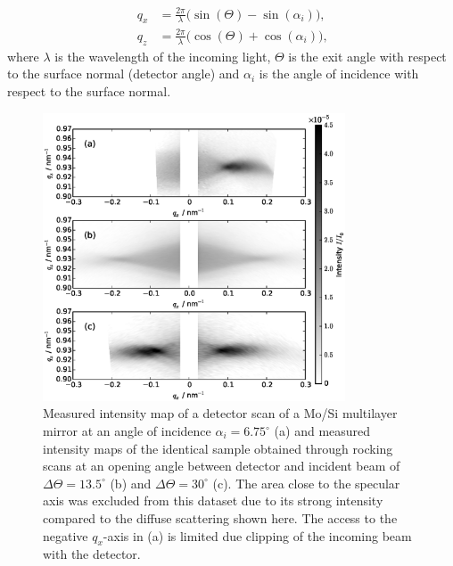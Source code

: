 \documentclass[twocolumn,osajnl,showpacs,superscriptaddress,11pt]{revtex4-1}
\begin{document}
\begin{align}
	q_x &= \frac{2 \pi}{\lambda} \big(\sin(\Theta) - \sin(\alpha_i)\big) \text{,}\\
	q_z &= \frac{2\pi}{\lambda} \big(\cos(\Theta) + \cos(\alpha_i)\big) \text{,} 
\end{align}
where $\lambda$ is the wavelength of the incoming light, $\Theta$ is the exit angle with respect to the surface normal (detector angle) and $\alpha_i$ is the angle of incidence with respect to the surface normal.

\begin{figure}
        \includegraphics[width=
        0.8\textwidth]{measured_maps} \caption{Measured intensity map of a detector scan of a Mo/Si multilayer mirror at an angle of incidence $\alpha_i = 6.75^\circ$ (a) and  measured intensity maps of the identical sample obtained through rocking scans at an opening angle between detector and incident beam of $\Delta \Theta = 13.5^\circ$ (b) and $\Delta \Theta = 30^\circ$ (c). The area close to the specular axis was excluded from this dataset due to its strong intensity compared to the diffuse scattering shown here. The access to the negative $q_x$-axis in (a) is limited due clipping of the incoming beam with the detector.} \label{fig:comparison} 
\end{figure}
\end{document}
